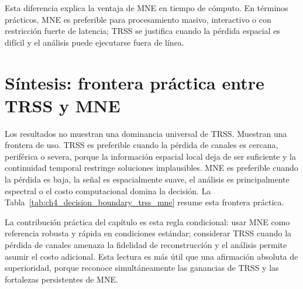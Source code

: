 

Esta diferencia explica la ventaja de MNE en tiempo de cómputo. En términos prácticos, MNE es preferible para procesamiento masivo, interactivo o con restricción fuerte de latencia; TRSS se justifica cuando la pérdida espacial es difícil y el análisis puede ejecutarse fuera de línea.

\FloatBarrier

\section{Síntesis: frontera práctica entre TRSS y MNE}

Los resultados no muestran una dominancia universal de TRSS. Muestran una frontera de uso. TRSS es preferible cuando la pérdida de canales es cercana, periférica o severa, porque la información espacial local deja de ser suficiente y la continuidad temporal restringe soluciones implausibles. MNE es preferible cuando la pérdida es baja, la señal es espacialmente suave, el análisis es principalmente espectral o el costo computacional domina la decisión. La Tabla~\ref{tab:ch4_decision_boundary_trss_mne} resume esta frontera práctica.



La contribución práctica del capítulo es esta regla condicional: usar MNE como referencia robusta y rápida en condiciones estándar; considerar TRSS cuando la pérdida de canales amenaza la fidelidad de reconstrucción y el análisis permite asumir el costo adicional. Esta lectura es más útil que una afirmación absoluta de superioridad, porque reconoce simultáneamente las ganancias de TRSS y las fortalezas persistentes de MNE.
